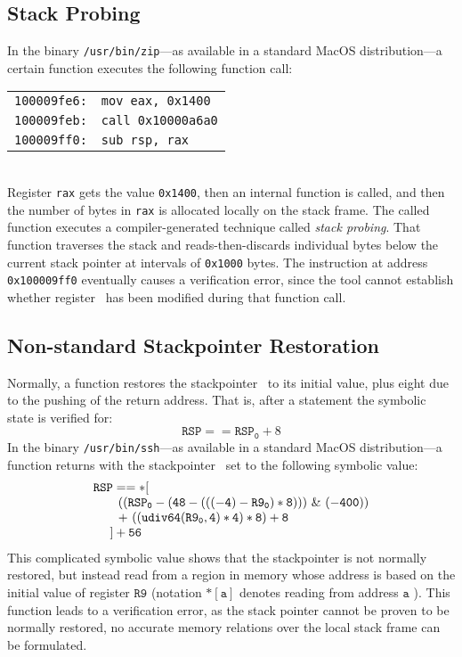 \subsection{Stack Probing}
In the binary \texttt{/usr/bin/zip}---as available in a standard MacOS distribution---a certain function executes the following function call:
\\[1ex]
\hspace{3em}\begin{tabular}{ll}
  \texttt{100009fe6:} & \texttt{mov	eax, 0x1400}\\
  \texttt{100009feb:} & \texttt{call	0x10000a6a0}\\
  \texttt{100009ff0:} & \texttt{sub	rsp, rax}
\end{tabular}
\\[1ex]
Register \texttt{rax} gets the value \texttt{0x1400}, then an internal function is called, and then the number of bytes in \texttt{rax} is allocated locally on the stack frame.
The called function executes a compiler-generated technique called \emph{stack probing}.
That function traverses the stack and reads-then-discards individual bytes below the current stack pointer at intervals of \texttt{0x1000} bytes.
The instruction at address \texttt{0x100009ff0} eventually causes a verification error, since the tool cannot establish whether register \rax\ has been modified during that function call.

\subsection{Non-standard Stackpointer Restoration}
Normally, a function restores the stackpointer \rsp\ to its initial value, plus eight due to the pushing of the return address. That is, after a  statement the symbolic state is verified for:
\begin{equation*}
  \mathtt{RSP} == \mathtt{RSP_0} + 8
\end{equation*}
In the binary \texttt{/usr/bin/ssh}---as available in a standard MacOS distribution---a function returns with the stackpointer \rsp\ set to the following symbolic value:
\begin{equation*}
  \begin{array}{ll}
    \multicolumn{2}{l}{\mathtt{RSP == *[ }}\\
    & \mathtt{ ~~~((RSP_0 - (48 - (((-4) - R9_0) * 8))) ~\&~(-400))  }\\
    & \mathtt{ ~~~ +~((udiv64(R9_0,4) * 4) * 8) + 8}\\
    & \mathtt{ ~] + 56}\\
  \end{array}
\end{equation*}
This complicated symbolic value shows that the stackpointer is not normally restored, but instead read from a region in memory whose address is based on the initial value of register $\mathtt{R9}$ (notation $\mathtt{*[a]}$ denotes reading from address $\mathtt{a}$ ).
This function leads to a verification error, as the stack pointer cannot be proven to be normally restored, no accurate memory relations over the local stack frame can be formulated.
